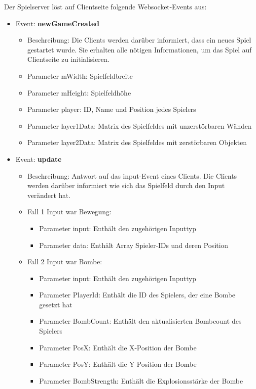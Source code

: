 \documentclass[conference]{IEEEtran}
\begin{document}
\smallskip

Der Spielserver löst auf Clientseite folgende Websocket-Events aus:
\begin{itemize}
\item Event: \textbf{newGameCreated}
\begin{itemize}
\item Beschreibung:
    Die Clients werden darüber informiert, dass ein neues Spiel gestartet wurde. Sie erhalten alle nötigen Informationen, um das Spiel auf Clientseite zu initialisieren.
    
\item Parameter \glqq mWidth\grqq{}: Spielfeldbreite
\item Parameter \glqq mHeight\grqq{}: Spielfeldhöhe
\item Parameter \glqq player\grqq{}: ID, Name und Position jedes Spielers
\item Parameter \glqq layer1Data\grqq{}: Matrix des Spielfeldes mit unzerstörbaren Wänden
\item Parameter \glqq layer2Data\grqq{}: Matrix des Spielfeldes mit zerstörbaren Objekten
\end{itemize}

\item Event: \textbf{update}
\begin{itemize}
\item Beschreibung:
    Antwort auf das \glqq input\grqq-Event eines Clients. Die Clients werden darüber informiert wie sich das Spielfeld durch den Input verändert hat.
    
\item Fall 1 Input war Bewegung:
\begin{itemize}
\item Parameter \glqq input\grqq{}: Enthält den zugehörigen Inputtyp
\item Parameter \glqq data\grqq{}: Enthält Array Spieler-IDs und deren Position
\end{itemize}

\item Fall 2 Input war Bombe:
\begin{itemize}
\item Parameter \glqq input\grqq{}: Enthält den zugehörigen Inputtyp
\item Parameter \glqq PlayerId\grqq{}: Enthält die ID des Spielers, der eine Bombe gesetzt hat
\item Parameter \glqq BombCount\grqq{}: Enthält den aktualisierten Bombcount des Spielers
\item Parameter \glqq PosX\grqq{}: Enthält die X-Position der Bombe
\item Parameter \glqq PosY\grqq{}: Enthält die Y-Position der Bombe
\item Parameter \glqq BombStrength\grqq{}: Enthält die Explosionsstärke der Bombe
\end{itemize}
    

\end{itemize}
\end{itemize}
\end{document}
